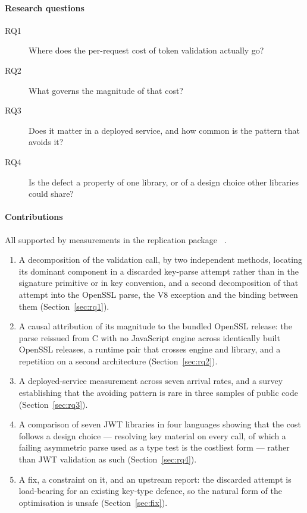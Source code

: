 \documentclass[pdflatex,sn-basic,twocolumn]{sn-jnl}%
\providecommand{\DIFaddbegin}{} %
\providecommand{\DIFaddend}{} %
\providecommand{\DIFdelbegin}{} %
\providecommand{\DIFdelend}{} %
\newcommand{\DIFscaledelfig}{0.5}
\newlength{\DIFdelgraphicswidth} %
\newlength{\DIFdelgraphicsheight} %
\newcommand{\DIFaddincludegraphics}[2][]{{\color{blue}\fbox{\DIFOincludegraphics[#1]{#2}}}} %
\newcommand{\DIFdelincludegraphics}[2][]{%
\sbox{\DIFdelgraphicsbox}{\DIFOincludegraphics[#1]{#2}}%
\settoboxwidth{\DIFdelgraphicswidth}{\DIFdelgraphicsbox} %
\settoboxtotalheight{\DIFdelgraphicsheight}{\DIFdelgraphicsbox} %
\scalebox{\DIFscaledelfig}{%
\parbox[b]{\DIFdelgraphicswidth}{\usebox{\DIFdelgraphicsbox}\\[-\baselineskip] \rule{\DIFdelgraphicswidth}{0em}}\llap{\resizebox{\DIFdelgraphicswidth}{\DIFdelgraphicsheight}{%
\setlength{\unitlength}{\DIFdelgraphicswidth}%
\begin{picture}(1,1)%
\thicklines\linethickness{2pt} %
{\color[rgb]{1,0,0}\put(0,0){\framebox(1,1){}}}%
{\color[rgb]{1,0,0}\put(0,0){\line( 1,1){1}}}%
{\color[rgb]{1,0,0}\put(0,1){\line(1,-1){1}}}%
\end{picture}%
}\hspace*{3pt}}} %
} %
\DeclareRobustCommand{\DIFaddbegin}{\DIFOaddbegin \let\includegraphics\DIFaddincludegraphics} %
\DeclareRobustCommand{\DIFaddend}{\DIFOaddend \let\includegraphics\DIFOincludegraphics} %
\DeclareRobustCommand{\DIFdelbegin}{\DIFOdelbegin \let\includegraphics\DIFdelincludegraphics} %
\DeclareRobustCommand{\DIFdelend}{\DIFOaddend \let\includegraphics\DIFOincludegraphics} %
\begin{document}
\paragraph{Research questions}
\begin{description}
\item[RQ1] Where does the per-request cost of token validation actually go?
\item[RQ2] What governs the magnitude of that cost?
\item[RQ3] Does it matter in a deployed service, and how common is the pattern
           that avoids it?
\item[RQ4] Is the defect a property of one library, or of a design choice other
           libraries could share?
\end{description}

\paragraph{Contributions} All supported by measurements in the replication
package~\DIFdelbegin %
\DIFdelend \DIFaddbegin \citep{artifact2026}\DIFaddend .

\begin{enumerate}
\item A decomposition of the validation call, by two independent methods,
      locating its dominant component in a discarded key-parse attempt rather
      than in the signature primitive or in key conversion, and a second
      decomposition of that attempt into the OpenSSL parse, the V8 exception
      and the binding between them (Section~\ref{sec:rq1}).
\item A causal attribution of its magnitude to the bundled OpenSSL release: the
      parse reissued from C with no JavaScript engine across
      \CProbeVersionCount{} identically built OpenSSL releases, a runtime pair
      that crosses engine and library, and a repetition on a second
      architecture (Section~\ref{sec:rq2}).
\item A deployed-service measurement across seven arrival rates, and a survey
      establishing that the avoiding pattern is rare in three samples of public
      code (Section~\ref{sec:rq3}).
\item A comparison of seven JWT libraries in four languages showing that the
      cost follows a design choice --- resolving key material on every call,
      of which a failing asymmetric parse used as a type test is the costliest
      form --- rather than JWT validation as such (Section~\ref{sec:rq4}).
\item A fix, a constraint on it, and an upstream report: the discarded attempt
      is load-bearing for an existing key-type defence, so the natural form of
      the optimisation is unsafe (Section~\ref{sec:fix}).
\end{enumerate}
\end{document}
